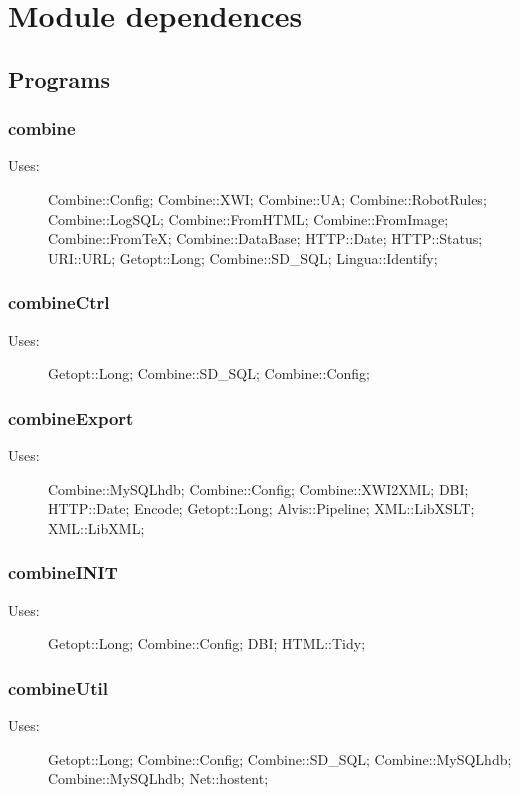 
\section{Module dependences}
\label{moddep}
\subsection{Programs}
\subsubsection{combine}
\begin{description}
\item[Uses:] Combine::Config; Combine::XWI; Combine::UA; Combine::RobotRules; Combine::LogSQL; Combine::FromHTML; Combine::FromImage; Combine::FromTeX; Combine::DataBase; HTTP::Date; HTTP::Status; URI::URL; Getopt::Long; Combine::SD\_SQL; Lingua::Identify; 

\end{description}
\subsubsection{combineCtrl}
\begin{description}
\item[Uses:] Getopt::Long; Combine::SD\_SQL; Combine::Config; 

\end{description}
\subsubsection{combineExport}
\begin{description}
\item[Uses:] Combine::MySQLhdb; Combine::Config; Combine::XWI2XML; DBI; HTTP::Date; Encode; Getopt::Long; Alvis::Pipeline; XML::LibXSLT; XML::LibXML; 

\end{description}
\subsubsection{combineINIT}
\begin{description}
\item[Uses:] Getopt::Long; Combine::Config; DBI; HTML::Tidy; 

\end{description}
\subsubsection{combineUtil}
\begin{description}
\item[Uses:] Getopt::Long; Combine::Config; Combine::SD\_SQL; Combine::MySQLhdb; Combine::MySQLhdb; Net::hostent; 

\end{description}
